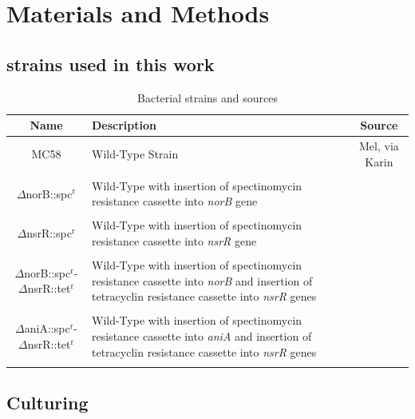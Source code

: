 \chapter{Materials and Methods}
\section{\Nsm\space strains used in this work}
\begin{table}[here]
\begin{center}
\begin{tabular}{|c|p{7cm}|c|}
\hline
\textbf{Name} & \textbf{Description} & \textbf{Source} \\
\hline
MC58 & Wild-Type Strain & Mel, via Karin \\
&&\\ %
\hline
$\Delta$norB::spc$^\textrm{r}$ & Wild-Type with insertion of spectinomycin resistance cassette into \textit{norB} gene & \citet{Heurlier2008} \\
&&\\ %
\hline
$\Delta$nsrR::spc$^\textrm{r}$ & Wild-Type with insertion of spectinomycin resistance cassette into \textit{nsrR} gene & \citet{Rock2007} \\
&&\\ %
\hline
$\Delta$norB::spc$^\textrm{r}$-$\Delta$nsrR::tet$^\textrm{r}$ & Wild-Type with insertion of spectinomycin resistance cassette into \textit{norB} and insertion of tetracyclin resistance cassette into \textit{nsrR} genes & \citet{Heurlier2008}\\
&&\\ %
\hline
$\Delta$aniA::spc$^\textrm{r}$-$\Delta$nsrR::tet$^\textrm{r}$ & Wild-Type with insertion of spectinomycin resistance cassette into \textit{aniA} and insertion of tetracyclin resistance cassette into \textit{nsrR} genes & \citet{Heurlier2008} \\
&&\\ %
\hline
\end{tabular} 
\end{center}
\small{\caption{Bacterial strains and sources}
\label{tab:bacterial-strains}}
\end{table}

\section{Culturing \Nsm}
